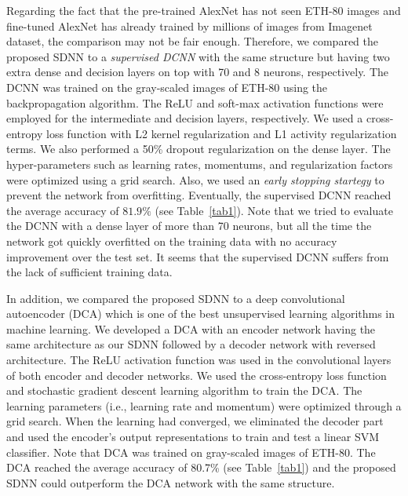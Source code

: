 \documentclass[preprint,5p,12pt,twocolumn]{article}
\begin{document}
Regarding the fact that the pre-trained AlexNet has not seen ETH-80 images and fine-tuned AlexNet has already trained by millions of images from Imagenet dataset, the comparison may not be fair enough. Therefore, we compared the proposed SDNN to a \textit{supervised DCNN} with the same structure but having two extra dense and decision layers on top with 70 and 8 neurons, respectively. The DCNN was trained on the gray-scaled images of ETH-80 using the backpropagation algorithm. The ReLU and soft-max activation functions were employed for the intermediate and decision layers, respectively. We used a cross-entropy loss function with L2 kernel regularization and L1 activity regularization terms. We also performed a 50\% dropout regularization on the dense layer. The hyper-parameters such as learning rates, momentums, and regularization factors were optimized using a grid search. Also, we used an \textit{early stopping startegy} to prevent the network from overfitting. Eventually, the supervised DCNN reached the average accuracy of $81.9\%$ (see Table~\ref{tab1}). Note that we tried to evaluate the DCNN with a dense layer of more than 70 neurons, but all the time the network got quickly  overfitted on the training data with no accuracy improvement over the test set. It seems that the supervised DCNN suffers from the lack of sufficient training data.


In addition, we compared the proposed SDNN to a deep convolutional autoencoder (DCA) which is one of the best unsupervised learning algorithms in machine learning. We developed a DCA with an encoder network having the same architecture as our SDNN followed by a decoder network with reversed architecture. The ReLU activation function was used in the convolutional layers of both encoder and decoder networks. We used the cross-entropy loss function and stochastic gradient descent learning algorithm to train the DCA. The learning parameters (i.e., learning rate and momentum) were optimized through a grid search. When the learning had converged, we eliminated the decoder part and used the encoder's output representations to train and test a linear SVM classifier. Note that DCA was trained on gray-scaled images of ETH-80. The DCA reached the average accuracy of 80.7\% (see Table~\ref{tab1}) and the proposed SDNN could outperform the DCA network with the same structure. 

\end{document}
